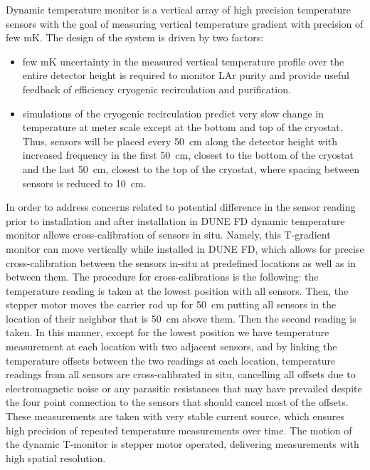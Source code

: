 Dynamic temperature monitor is a vertical array of high precision temperature sensors with the goal of measuring vertical temperature gradient with precision of few mK. The design of the system is driven by two factors:
\begin{itemize}
\item
few mK uncertainty in the measured vertical temperature profile over the entire detector height is required to monitor LAr purity and provide useful feedback of efficiency cryogenic recirculation and purification.
\item
simulations of the cryogenic recirculation predict very slow change in temperature at meter scale except at the bottom and top of the cryostat. Thus, sensors will be placed every \SI{50}{cm} along the detector height with increased frequency in the first \SI{50}{cm}, closest to the bottom of the cryostat and the last \SI{50}{cm}, closest to the top of the cryostat, where spacing between sensors is reduced to \SI{10}{cm}.
 \end{itemize}


 In order to address concerns related to potential difference in the sensor reading prior to installation and after installation in DUNE FD dynamic temperature monitor allows cross-calibration of sensors in situ. Namely, this T-gradient monitor  can move vertically while installed in DUNE FD, which allows for precise cross-calibration between the sensors in-situ at predefined locations as well as in between them. The procedure for cross-calibrations is the following: the temperature reading is taken at the lowest position with all sensors. Then, the stepper motor moves the carrier rod up for \SI{50}{cm} putting all sensors in the location of their neighbor that is \SI{50}{cm} above them. Then the second reading is taken. In this manner, except for the lowest position we have temperature measurement at each location with two adjacent sensors, and by linking the temperature offsets between the two readings at each location, temperature readings from all sensors are cross-calibrated in situ, cancelling all offsets due to electromagnetic noise or any parasitic resistances that may have prevailed despite the four point connection to the sensors that should cancel most of the offsets. These measurements are taken with very stable current source, which ensures high precision of repeated temperature measurements over time. The motion of the dynamic T-monitor is stepper motor operated, delivering measurements with high spatial resolution. 


